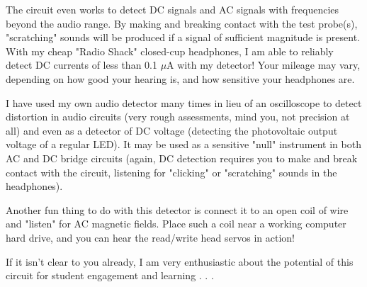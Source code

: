 The circuit even works to detect DC signals and AC signals with frequencies beyond the audio range.  By making and breaking contact with the test probe(s), "scratching" sounds will be produced if a signal of sufficient magnitude is present.  With my cheap "Radio Shack" closed-cup headphones, I am able to reliably detect DC currents of less than 0.1 $\mu$A with my detector!  Your mileage may vary, depending on how good your hearing is, and how sensitive your headphones are.

I have used my own audio detector many times in lieu of an oscilloscope to detect distortion in audio circuits (very rough assessments, mind you, not precision at all) and even as a detector of DC voltage (detecting the photovoltaic output voltage of a regular LED).  It may be used as a sensitive "null" instrument in both AC and DC bridge circuits (again, DC detection requires you to make and break contact with the circuit, listening for "clicking" or "scratching" sounds in the headphones).

Another fun thing to do with this detector is connect it to an open coil of wire and "listen" for AC magnetic fields.  Place such a coil near a working computer hard drive, and you can hear the read/write head servos in action!

If it isn't clear to you already, I am very enthusiastic about the potential of this circuit for student engagement and learning . . .




